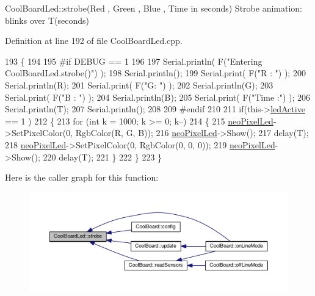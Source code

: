 Cool\+Board\+Led\+::strobe(\+Red , Green , Blue , Time in seconds) Strobe animation\+: blinks over T(seconds) 

Definition at line 192 of file Cool\+Board\+Led.\+cpp.


\begin{DoxyCode}
193 \{
194 
195 \textcolor{preprocessor}{#if DEBUG == 1}
196 
197     Serial.println( F(\textcolor{stringliteral}{"Entering CoolBoardLed.strobe()"}) );
198     Serial.println();
199     Serial.print( F(\textcolor{stringliteral}{"R : "}) );
200     Serial.println(R);
201     Serial.print( F(\textcolor{stringliteral}{"G: "}) );
202     Serial.println(G);
203     Serial.print( F(\textcolor{stringliteral}{"B : "}) );
204     Serial.println(B);
205     Serial.print( F(\textcolor{stringliteral}{"Time :"}) );
206     Serial.println(T);
207     Serial.println();
208 
209 \textcolor{preprocessor}{#endif  }
210 
211     \textcolor{keywordflow}{if}(this->\hyperlink{class_cool_board_led_aadd04d2ecf123247718d77f42fba7f08}{ledActive} == 1 )
212     \{   
213         \textcolor{keywordflow}{for} (\textcolor{keywordtype}{int} k = 1000; k >= 0; k--) 
214         \{
215             \hyperlink{class_cool_board_led_ac2c13fa462a010cd9242bf297c013923}{neoPixelLed}->SetPixelColor(0, RgbColor(R, G, B));
216             \hyperlink{class_cool_board_led_ac2c13fa462a010cd9242bf297c013923}{neoPixelLed}->Show();
217             delay(T);
218             \hyperlink{class_cool_board_led_ac2c13fa462a010cd9242bf297c013923}{neoPixelLed}->SetPixelColor(0, RgbColor(0, 0, 0));
219             \hyperlink{class_cool_board_led_ac2c13fa462a010cd9242bf297c013923}{neoPixelLed}->Show();
220             delay(T);
221         \}
222     \}
223 \}
\end{DoxyCode}
Here is the caller graph for this function\+:\nopagebreak
\begin{figure}[H]
\begin{center}
\leavevmode
\includegraphics[width=350pt]{de/dc0/class_cool_board_led_ad5f0de4c628cbfbf49896042831c64ad_icgraph}
\end{center}
\end{figure}
\mbox{\label{class_cool_board_led_a30fadd4cbec17ceea428bf7a32207e87}} 
